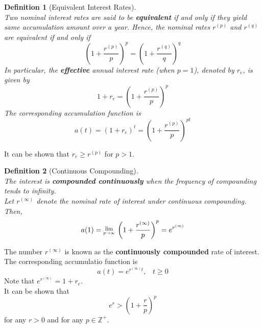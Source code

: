 \documentclass[12pt]{article}
\newcommand{\Lim}[1]{\raisebox{0.5ex}{\scalebox{0.8}{$\displaystyle \lim_{#1}\;$}}}
\newtheorem{definition}{Definition}[section]
\theoremstyle{definition}
\begin{document}
\begin{definition}[Equivalent Interest Rates]
\hfill\\\normalfont Two nominal interest rates are said to be \textbf{equivalent} if and only if they yield same accumulation amount over a year. Hence, the nominal rates $r^{(p)}$ and $r^{(q)}$ are equivalent if and only if
\[
\left(1+\frac{r^{(p)}}{p}\right)^p=\left(1+\frac{r^{(q)}}{q}\right)^q
\]
In particular, the \textbf{effective} annual interest rate (when $p=1$), denoted by $r_e$, is given by
\[
1+r_e = \left(1+\frac{r^{(p)}}{p}\right)^p
\]
The corresponding accumulation function is
\[
a(t) = (1+r_e)^t = \left(1+\frac{r^{(p)}}{p}\right)^{pt}
\]
\end{definition}
It can be shown that $r_e\geq r^{(p)}$ for $p>1$.
\begin{definition}[Continuous Compounding]
\hfill\\\normalfont The interest is \textbf{compounded continuously} when the frequency of compounding tends to infinity.\\
Let $r^{(\infty)}$ denote the nominal rate of interest under continuous compounding. Then,
\[
a(1)=\Lim{p\to\infty}\left(1+\frac{r^{(\infty)}}{p}\right)^p = e^{r^{(\infty)}}
\]
\end{definition}
The number $r^{(\infty)}$ is known as the \textbf{continuously compounded} rate of interest.
The corresponding accumulatio function is
\[
a(t) = e^{r^{(\infty)}t},\;\;\;t\geq 0
\]
Note that $e^{r^{(\infty)}}= 1+r_e$.\\
It can be shown that
\[
e^r>\left(1+\frac{r}{p}\right)^p
\]
for any $r>0$ and for any $p\in\mathbb{Z}^+$.
\end{document}

